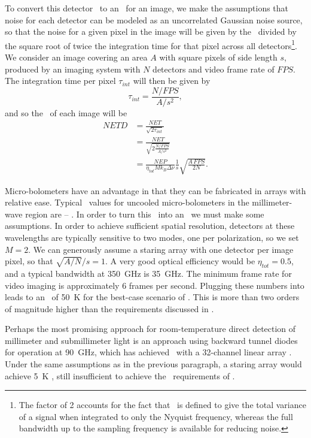 To convert this detector \NET\ to an \NETD\ for an image, we make the assumptions that noise for each detector can be modeled as an uncorrelated Gaussian noise source, so that the noise for a given pixel in the image will be given by the \NET\ divided by the square root of twice the integration time for that pixel across all detectors\footnote{%
  The factor of 2 accounts for the fact that \NEP\ is defined to give the total variance of a signal when integrated to only the Nyquist frequency, whereas the full bandwidth up to the sampling frequency is available for reducing noise.
}. 
We consider an image covering an area $A$ with square pixels of side length $s$, produced by an imaging system with $N$ detectors and video frame rate of $FPS$.
The integration time per pixel $\tau_{int}$ will then be given by
\begin{equation}
  \tau_{int} = \frac{N / FPS}{A / s^2},
\end{equation}
and so the \NETD\ of each image will be
\begin{align}
  NETD & = \frac{NET}{\sqrt{2\tau_{int}}} \\
       & = \frac{NET}{\sqrt{ 2 \frac{N / FPS}{A / s^2}}} \\
       & = \frac{NEP}{\eta_{tot} M k_B \Delta \nu} \frac{1}{s} \sqrt{\frac{A\,FPS}{2 N}} .
       \label{eqn:ch1-netd-defn}
\end{align}

Micro-bolometers have an advantage in that they can be fabricated in arrays with relative ease.
Typical \NEP\ values for uncooled micro-bolometers in the millimeter-wave region are -- \cite{nemarich_microbolometer_2005,rogalski_terahertz_2011}.
In order to turn this \NEP\ into an \NETD\ we must make some assumptions.
In order to achieve sufficient spatial resolution, detectors at these wavelengths are typically sensitive to two modes, one per polarization, so we set $M = 2$.
We can generously assume a staring array with one detector per image pixel, so that $\sqrt{A/N}/s = 1$.
A very good optical efficiency would be $\eta_{tot} = 0.5$, and a typical bandwidth at \SI{350}{\GHz} is \SI{35}{\GHz}.
The minimum frame rate for video imaging is approximately 6 frames per second.
Plugging these numbers into  leads to an \NETD\ of \SI{50}{\K} for the best-case scenario of  \NEP.
This is more than two orders of magnitude higher than the requirements discussed in .

Perhaps the most promising approach for room-temperature direct detection of millimeter and submillimeter light is an approach using backward tunnel diodes for operation at \SI{90}{\GHz}, which has achieved  \NEP\ with a 32-channel linear array \cite{schaffner_wideband_2008,wikner_demonstration_2009}.
Under the same assumptions as in the previous paragraph, a staring array would achieve \SI{5}{\K} \NETD, still insufficient to achieve the \NETD\ requirements of .

